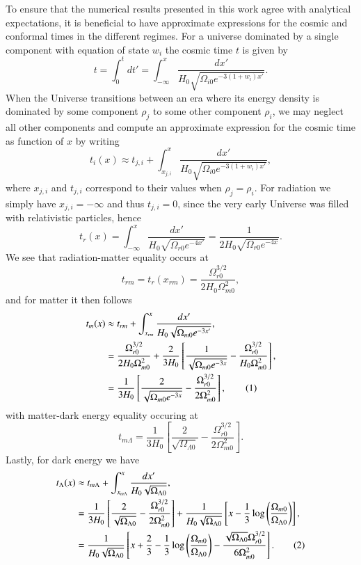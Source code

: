 \documentclass{aa}
\newcommand\numberthis{\addtocounter{equation}{1}\tag{\theequation}}
\numberwithin{equation}{section}
\numberwithin{table}{section}
\numberwithin{figure}{section}
\begin{document}
To ensure that the numerical results presented in this work agree with analytical expectations, it is beneficial to have approximate expressions for the cosmic and conformal times in the different regimes. For a universe dominated by a single component with equation of state $w_i$ the cosmic time $t$ is given by
\begin{equation}
  t = \int_0^t dt' = \int_{-\infty}^{x}\frac{dx'}{H_0\sqrt{\Omega_{i0}e^{-3(1+w_i)x'}}}.
\end{equation}
When the Universe transitions between an era where its energy density is dominated by some component $\rho_j$ to some other component $\rho_i$, we may neglect all other components and compute an approximate expression for the cosmic time as function of $x$ by writing
\begin{equation}
  t_i(x) \approx t_{j,i} + \int_{x_{j,i}}^{x}\frac{dx'}{H_0\sqrt{\Omega_{i0}e^{-3(1+w_i)x'}}},
\end{equation}
where $x_{j,i}$ and $t_{j,i}$ correspond to their values when $\rho_j=\rho_i$. For radiation we simply have $x_{j,i}=-\infty$ and thus $t_{j,i}=0$, since the very early Universe was filled with relativistic particles, hence
\begin{equation}
  t_r(x) = \int_{{-\infty}}^{x}\frac{dx'}{H_0\sqrt{\Omega_{r0}e^{-4x'}}} = \frac{1}{2H_0\sqrt{\Omega_{r0}e^{-4x}}}.
\end{equation}
We see that radiation-matter equality occurs at
\begin{equation}
  t_{rm} = t_r(x_{rm}) = \frac{\Omega_{r0}^{3/2}}{2H_0\Omega_{m0}^2},
\end{equation}
and for matter it then follows
\begin{align*}
  t_m(x) &\approx t_{rm} + \int_{x_{rm}}^{x}\frac{dx'}{H_0\sqrt{\Omega_{m0}e^{-3x'}}}, 
  \\
  &= \frac{\Omega_{r0}^{3/2}}{2H_0\Omega_{m0}^2}+\frac{2}{3H_0}\left[\frac{1}{\sqrt{\Omega_{m0}e^{-3x}}} - \frac{\Omega_{r0}^{3/2}}{H_0\Omega_{m0}^2} \right],
  \\
  &= \frac{1}{3H_0}\left[\frac{2}{\sqrt{\Omega_{m0}e^{-3x}}} - \frac{\Omega_{r0}^{3/2}}{2\Omega^2_{m0}} \right], \numberthis
\end{align*}
with matter-dark energy equality occuring at
\begin{equation}
  t_{m\Lambda} = \frac{1}{3H_0}\left[\frac{2}{\sqrt{\Omega_{\Lambda0}}} - \frac{\Omega_{r0}^{3/2}}{2\Omega^2_{m0}} \right].
\end{equation}
Lastly, for dark energy we have
\begin{align*}
  t_\Lambda(x) &\approx t_{m\Lambda} + \int_{x_{m\Lambda}}^{x}\frac{dx'}{H_0\sqrt{\Omega_{\Lambda0}}}, 
  \\
  &= \frac{1}{3H_0}\left[\frac{2}{\sqrt{\Omega_{\Lambda0}}} - \frac{\Omega_{r0}^{3/2}}{2\Omega^2_{m0}} \right] + \frac{1}{H_0\sqrt{\Omega_{\Lambda0}}}\left[x - \frac{1}{3}\log\left(\frac{\Omega_{m0}}{\Omega_{\Lambda0}}\right)\right],
  \\
  &= \frac{1}{H_0\sqrt{\Omega_{\Lambda0}}}\left[x+\frac{2}{3}-\frac{1}{3}\log\left(\frac{\Omega_{m0}}{\Omega_{\Lambda0}}\right)-\frac{\sqrt{\Omega_{\Lambda0}}\Omega_{r0}^{3/2}}{6\Omega^2_{m0}}\right]. \numberthis
\end{align*}
\end{document}
